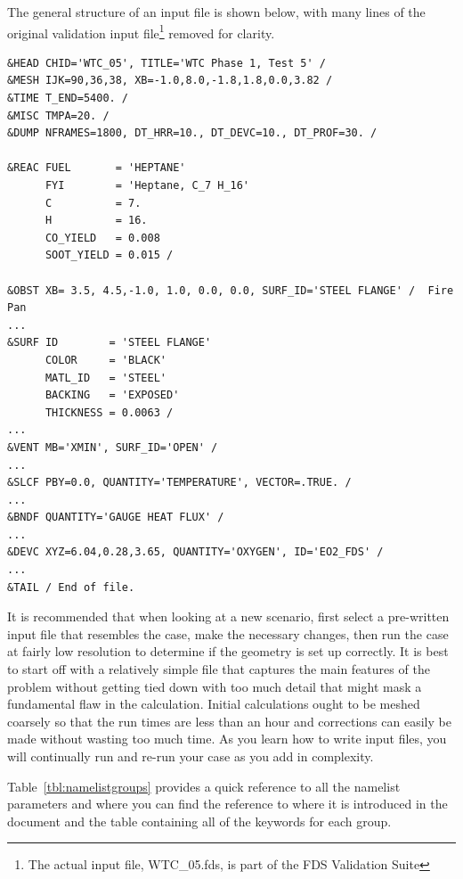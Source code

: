 \documentclass[11pt]{book}
\begin{document}
The general structure of an input file is shown below, with many
lines of the original validation input file\footnote{The actual input file, WTC\_05.fds, is part of the FDS
Validation Suite} removed for clarity.

\footnotesize
\begin{verbatim}
&HEAD CHID='WTC_05', TITLE='WTC Phase 1, Test 5' /
&MESH IJK=90,36,38, XB=-1.0,8.0,-1.8,1.8,0.0,3.82 /
&TIME T_END=5400. /
&MISC TMPA=20. /
&DUMP NFRAMES=1800, DT_HRR=10., DT_DEVC=10., DT_PROF=30. /

&REAC FUEL       = 'HEPTANE'
      FYI        = 'Heptane, C_7 H_16'
      C          = 7.
      H          = 16.
      CO_YIELD   = 0.008
      SOOT_YIELD = 0.015 /

&OBST XB= 3.5, 4.5,-1.0, 1.0, 0.0, 0.0, SURF_ID='STEEL FLANGE' /  Fire Pan
...
&SURF ID        = 'STEEL FLANGE'
      COLOR     = 'BLACK'
      MATL_ID   = 'STEEL'
      BACKING   = 'EXPOSED'
      THICKNESS = 0.0063 /
...
&VENT MB='XMIN', SURF_ID='OPEN' /
...
&SLCF PBY=0.0, QUANTITY='TEMPERATURE', VECTOR=.TRUE. /
...
&BNDF QUANTITY='GAUGE HEAT FLUX' /
...
&DEVC XYZ=6.04,0.28,3.65, QUANTITY='OXYGEN', ID='EO2_FDS' /
...
&TAIL / End of file.
\end{verbatim}
\normalsize

\noindent
It is recommended that when looking at a new scenario,
first select a pre-written input file that resembles the case,
make the necessary changes, then run the case at fairly low
resolution to determine if the geometry is set up correctly.
It is best to start off with a relatively simple file that captures the main
features of the problem without getting tied down with too much detail that
might mask a fundamental flaw in the calculation. Initial calculations ought
to be meshed coarsely so that the run times are less than an hour and
corrections can easily be made without wasting too much time.
As you learn how to write input files, you will continually
run and re-run your case as you add in complexity.

Table~\ref{tbl:namelistgroups} provides a quick reference to all the namelist parameters and
where you can find the reference to where it is introduced in the document and the
table containing all of the keywords for each group.
\end{document}
